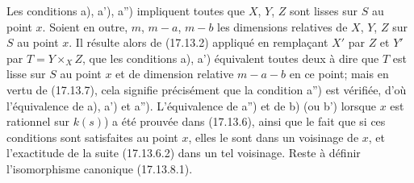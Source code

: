 Les conditions a), a'), a'') impliquent toutes que $X$, $Y$, $Z$ sont lisses sur $S$ au point $x$. Soient en outre, $m$, $m-a$, $m-b$ les dimensions relatives de $X$, $Y$, $Z$ sur $S$ au point $x$. Il résulte alors de (17.13.2) appliqué en remplaçant $X'$ par $Z$ et $Y'$ par $T=Y\times_XZ$, que les conditions a), a') équivalent toutes deux à dire que $T$ est lisse sur $S$ au point $x$ et de dimension relative $m-a-b$ en ce point; mais en vertu de (17.13.7), cela signifie précisément que la condition a'') est vérifiée, d'où l'équivalence de a), a') et a''). L'équivalence de a'') et de b) (ou b') lorsque $x$ est rationnel sur $k(s)$) a été prouvée dans (17.13.6), ainsi que le fait que si ces conditions sont satisfaites au point $x$, elles le sont dans un voisinage de $x$, et l'exactitude de la suite (17.13.6.2) dans un tel voisinage. Reste à définir l'isomorphisme canonique (17.13.8.1).

